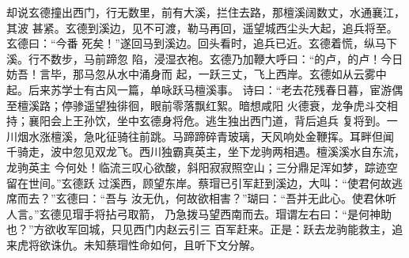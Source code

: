 却说玄德撞出西门，行无数里，前有大溪，拦住去路，那檀溪阔数丈，水通襄江，其波
甚紧。玄德到溪边，见不可渡，勒马再回，遥望城西尘头大起，追兵将至。玄德曰：“今番
死矣！”遂回马到溪边。回头看时，追兵已近。玄德着慌，纵马下溪。行不数步，马前蹄忽
陷，浸湿衣袍。玄德乃加鞭大呼曰：“的卢，的卢！今日妨吾！言毕，那马忽从水中涌身而
起，一跃三丈，飞上西岸。玄德如从云雾中起。后来苏学士有古风一篇，单咏跃马檀溪事。
诗曰：“老去花残春日暮，宦游偶至檀溪路；停骖遥望独徘徊，眼前零落飘红絮。暗想咸阳
火德衰，龙争虎斗交相持；襄阳会上王孙饮，坐中玄德身将危。逃生独出西门道，背后追兵
复将到。一川烟水涨檀溪，急叱征骑往前跳。马蹄蹄碎青玻璃，天风响处金鞭挥。耳畔但闻
千骑走，波中忽见双龙飞。西川独霸真英主，坐下龙驹两相遇。檀溪溪水自东流，龙驹英主
今何处！临流三叹心欲酸，斜阳寂寂照空山；三分鼎足浑如梦，踪迹空留在世间。”玄德跃
过溪西，顾望东岸。蔡瑁已引军赶到溪边，大叫：“使君何故逃席而去？”玄德曰：“吾与
汝无仇，何故欲相害？”瑚曰：“吾并无此心。使君休听人言。”玄德见瑁手将拈弓取箭，
乃急拨马望西南而去。瑁谓左右曰：“是何神助也？”方欲收军回城，只见西门内赵云引三
百军赶来。正是：跃去龙驹能救主，追来虎将欲诛仇。未知蔡瑁性命如何，且听下文分解。